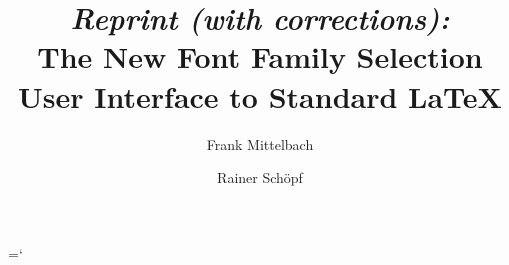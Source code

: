 \makeatother



 \newmathalphabet\sfmath
 \newmathalphabet*{}


\def\resetmathcodes{%
\mathcode`\0="7030
\mathcode`\1="7031
\mathcode`\2="7032
\mathcode`\3="7033
\mathcode`\4="7034
\mathcode`\5="7035
\mathcode`\6="7036
\mathcode`\7="7037
\mathcode`\8="7038
\mathcode`\9="7039
\mathchardef\sum="1350
}

\def\bf{\family{cmss}\series{bx}\selectfont}

\def\meta#1{$\langle${\it
                      \hyphenchar\the\font-1
                      #1\/$\rangle$}}


\def\Metafont{{\sf METAFONT}}

\chardef\bslash=`\\

\def\missing{[\ldots]\ }




 \title{{\it Reprint {\rm(}with corrections\/{\rm):}}\\
        The New Font Family Selection\Dash \\
        User Interface to Standard \LaTeX}

 \author{Frank Mittelbach \and
         Rainer Sch\"opf}%







\selectfont




